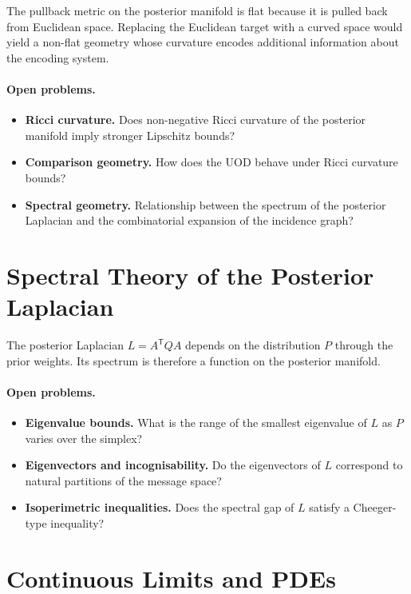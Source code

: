 The pullback metric on the posterior manifold is flat because it is
pulled back from Euclidean space.  Replacing the Euclidean target with
a curved space would yield a non-flat geometry whose curvature encodes
additional information about the encoding system.

\paragraph{Open problems.}
\begin{itemize}
\item \textbf{Ricci curvature.}  Does non-negative Ricci curvature of
the posterior manifold imply stronger Lipschitz bounds?
\item \textbf{Comparison geometry.}  How does the UOD behave under
Ricci curvature bounds?
\item \textbf{Spectral geometry.}  Relationship between the spectrum of
the posterior Laplacian and the combinatorial expansion of the
incidence graph?
\end{itemize}

\section{Spectral Theory of the Posterior Laplacian}\label{ch:sec:open-spectral}

The posterior Laplacian $L=A^{\mathsf T}QA$ depends on the
distribution $P$ through the prior weights.  Its spectrum is therefore
a function on the posterior manifold.

\paragraph{Open problems.}
\begin{itemize}
\item \textbf{Eigenvalue bounds.}  What is the range of the smallest
eigenvalue of $L$ as $P$ varies over the simplex?
\item \textbf{Eigenvectors and incognisability.}  Do the eigenvectors
of $L$ correspond to natural partitions of the message space?
\item \textbf{Isoperimetric inequalities.}  Does the spectral gap of
$L$ satisfy a Cheeger-type inequality?
\end{itemize}

\section{Continuous Limits and PDEs}\label{ch:sec:open-continuous-limits}

